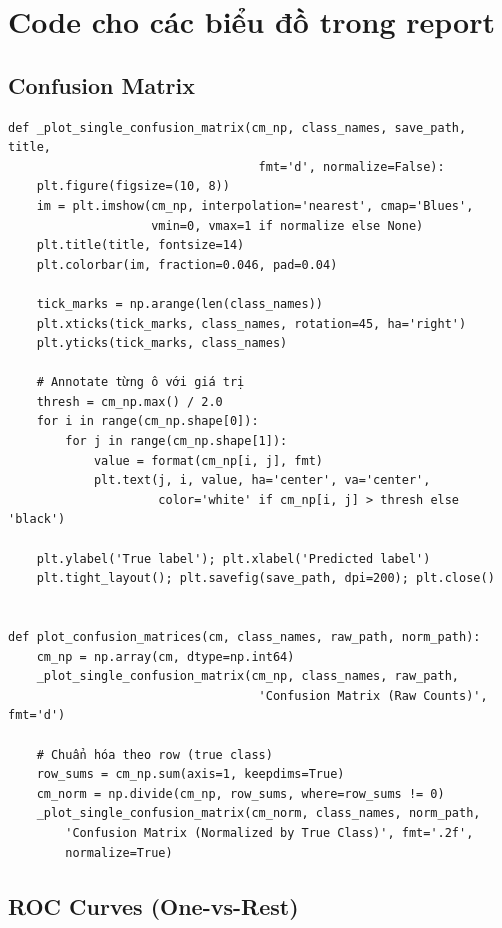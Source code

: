 \documentclass[11pt,a4paper]{article}
\begin{document}
\section{Code cho các biểu đồ trong report}

\subsection{Confusion Matrix}

\begin{lstlisting}[caption={\texttt{src/utils/plots.py} --- vẽ confusion matrix}]
def _plot_single_confusion_matrix(cm_np, class_names, save_path, title,
                                   fmt='d', normalize=False):
    plt.figure(figsize=(10, 8))
    im = plt.imshow(cm_np, interpolation='nearest', cmap='Blues',
                    vmin=0, vmax=1 if normalize else None)
    plt.title(title, fontsize=14)
    plt.colorbar(im, fraction=0.046, pad=0.04)

    tick_marks = np.arange(len(class_names))
    plt.xticks(tick_marks, class_names, rotation=45, ha='right')
    plt.yticks(tick_marks, class_names)

    # Annotate từng ô với giá trị
    thresh = cm_np.max() / 2.0
    for i in range(cm_np.shape[0]):
        for j in range(cm_np.shape[1]):
            value = format(cm_np[i, j], fmt)
            plt.text(j, i, value, ha='center', va='center',
                     color='white' if cm_np[i, j] > thresh else 'black')

    plt.ylabel('True label'); plt.xlabel('Predicted label')
    plt.tight_layout(); plt.savefig(save_path, dpi=200); plt.close()


def plot_confusion_matrices(cm, class_names, raw_path, norm_path):
    cm_np = np.array(cm, dtype=np.int64)
    _plot_single_confusion_matrix(cm_np, class_names, raw_path,
                                   'Confusion Matrix (Raw Counts)', fmt='d')

    # Chuẩn hóa theo row (true class)
    row_sums = cm_np.sum(axis=1, keepdims=True)
    cm_norm = np.divide(cm_np, row_sums, where=row_sums != 0)
    _plot_single_confusion_matrix(cm_norm, class_names, norm_path,
        'Confusion Matrix (Normalized by True Class)', fmt='.2f',
        normalize=True)
\end{lstlisting}

\subsection{ROC Curves (One-vs-Rest)}
\end{document}
